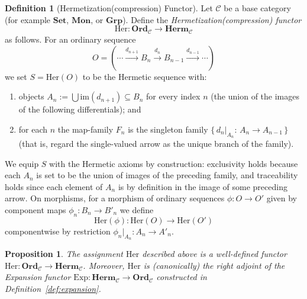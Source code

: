 \documentclass[11pt]{book}
\theoremstyle{definition}
\newtheorem{definition}{Definition}[section]
\theoremstyle{plain}
\newtheorem{proposition}[theorem]{Proposition}
\theoremstyle{remark}
\begin{document}
\begin{definition}[Hermetization(compression) Functor]\label{def:Her}
Let $\mathcal{C}$ be a base category (for example $\mathbf{Set}$, $\mathbf{Mon}$, or $\mathbf{Grp}$).
Define the \emph{Hermetization(compression) functor}
\[
\mathrm{Her}:\mathbf{Ord}_{\mathcal{C}}\longrightarrow \mathbf{Herm}_{\mathcal{C}}
\]
as follows.  For an ordinary sequence
\[
O = (\cdots \xrightarrow{d_{n+1}} B_n \xrightarrow{d_n} B_{n-1} \xrightarrow{d_{n-1}} \cdots)
\]
we set $S=\mathrm{Her}(O)$ to be the Hermetic sequence with:
\begin{enumerate}
  \item objects $A_n := \bigcup \mathrm{im}(d_{n+1}) \subseteq B_n$ for every index $n$ (the union of the images of the following differentials); and
  \item for each $n$ the map-family $F_n$ is the singleton family $\{\,d_n|_{A_n}:\,A_n\to A_{n-1}\,\}$ (that is, regard the single-valued arrow as the unique branch of the family).
\end{enumerate}
We equip $S$ with the Hermetic axioms by construction: exclusivity holds because each $A_n$ is set to be the union of images of the preceding family, and traceability holds since each element of $A_n$ is by definition in the image of some preceding arrow.
On morphisms, for a morphism of ordinary sequences $\phi:O\to O'$ given by component maps $\phi_n:B_n\to B'_n$ we define
\[
\mathrm{Her}(\phi):\mathrm{Her}(O)\to\mathrm{Her}(O')
\]
componentwise by restriction $\phi_n|_{A_n}:A_n\to A'_n$.
\end{definition}

\begin{proposition}\label{prop:Her_functor}
The assignment $\mathrm{Her}$ described above is a well-defined functor
$\mathrm{Her}:\mathbf{Ord}_{\mathcal{C}}\to\mathbf{Herm}_{\mathcal{C}}$.
Moreover, $\mathrm{Her}$ is (canonically) the right adjoint of the Expansion functor
$\mathrm{Exp}:\mathbf{Herm}_{\mathcal{C}}\to\mathbf{Ord}_{\mathcal{C}}$ constructed in Definition~\ref{def:expansion}.
\end{proposition}
\end{document}
